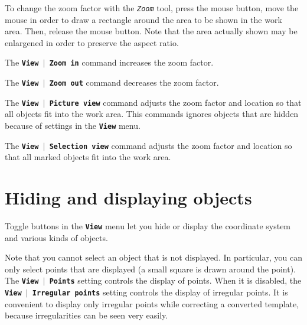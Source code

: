 \documentclass[12pt]{report}
\begin{document}
To change the zoom factor with the \textit{\texttt{Zoom}} tool, press
the mouse button, move the mouse in order to draw a rectangle around
the area to be shown in the work area. Then, release the mouse button.
Note that the area actually shown may be enlargened in order to
preserve the aspect ratio.

The \textbf{\texttt{View \begin{math}\vert{}\end{math} Zoom in}} command
increases the zoom factor.

The \textbf{\texttt{View \begin{math}\vert{}\end{math} Zoom out}}
command decreases the zoom factor.

The \textbf{\texttt{View \begin{math}\vert{}\end{math} Picture view}}
command adjusts the zoom factor and location so that all objects fit
into the work area. This commands ignores objects that are hidden
because of settings in the \textbf{\texttt{View}} menu.

The \textbf{\texttt{View \begin{math}\vert{}\end{math} Selection view}}
command adjusts the zoom factor and location so that all marked objects
fit into the work area.

\section{Hiding and displaying objects}

Toggle buttons in the \textbf{\texttt{View}} menu let you hide or
display the coordinate system and various kinds of objects.

Note that you cannot select an object that is not displayed. In
particular, you can only select points that are displayed (a small
square is drawn around the point). The
\textbf{\texttt{View \begin{math}\vert{}\end{math} Points}} setting
controls the display of points. When it is disabled, the
\textbf{\texttt{View \begin{math}\vert{}\end{math} Irregular points}}
setting controls the display of irregular points. It is convenient to
display only irregular points while correcting a converted template,
because irregularities can be seen very easily.
\end{document}
